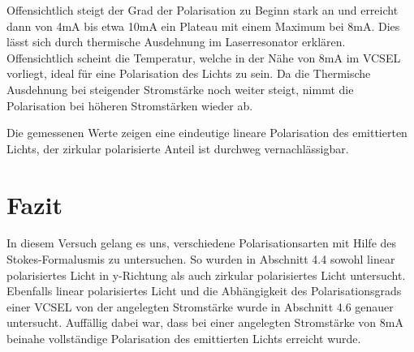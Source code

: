 \documentclass[bigchapter,colorback,accentcolor=tud4b,linedtoc,11pt]{tudreport}
\begin{document}
Offensichtlich steigt der Grad der Polarisation zu Beginn stark an und erreicht dann von 4mA bis etwa 10mA ein Plateau mit einem Maximum bei 8mA. Dies lässt sich durch thermische Ausdehnung im Laserresonator erklären. Offensichtlich scheint die Temperatur, welche in der Nähe von 8mA im VCSEL vorliegt, ideal für eine Polarisation des Lichts zu sein. Da die Thermische Ausdehnung bei steigender Stromstärke noch weiter steigt, nimmt die Polarisation bei höheren Stromstärken wieder ab.

Die gemessenen Werte zeigen eine eindeutige lineare Polarisation des emittierten Lichts, der zirkular polarisierte Anteil ist durchweg vernachlässigbar.
\begin{center}
\begin{figure}[h]
\end{figure}
\end{center}

\chapter{Fazit}

In diesem Versuch gelang es uns, verschiedene Polarisationsarten mit Hilfe des Stokes-Formalusmis zu untersuchen. So wurden in Abschnitt 4.4 sowohl linear polarisiertes Licht in y-Richtung als auch zirkular polarisiertes Licht untersucht. Ebenfalls linear polarisiertes Licht und die Abhängigkeit des Polarisationsgrads einer VCSEL von der angelegten Stromstärke wurde in Abschnitt 4.6 genauer untersucht. Auffällig dabei war, dass bei einer angelegten Stromstärke von 8mA beinahe vollständige Polarisation des emittierten Lichts erreicht wurde.
\end{document}
